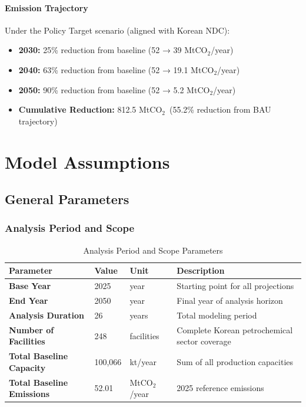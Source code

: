 \documentclass[11pt,a4paper]{report}
\newcommand{\mtco}{MtCO$_2$}
\begin{document}
\subsection*{Emission Trajectory}

Under the Policy Target scenario (aligned with Korean NDC):
\begin{itemize}[leftmargin=*]
    \item \textbf{2030:} 25\% reduction from baseline (52 → 39 \mtco/year)
    \item \textbf{2040:} 63\% reduction from baseline (52 → 19.1 \mtco/year)
    \item \textbf{2050:} 90\% reduction from baseline (52 → 5.2 \mtco/year)
    \item \textbf{Cumulative Reduction:} 812.5 \mtco\ (55.2\% reduction from BAU trajectory)
\end{itemize}

\clearpage

\part{Model Assumptions}
\label{part:assumptions}

\chapter{General Parameters}

\section{Analysis Period and Scope}

\begin{table}[H]
\centering
\caption{Analysis Period and Scope Parameters}
\begin{tabular}{p{5cm}p{3cm}p{2cm}p{5cm}}
\toprule
\textbf{Parameter} & \textbf{Value} & \textbf{Unit} & \textbf{Description} \\
\midrule
\textbf{Base Year} & 2025 & year & Starting point for all projections \\
\textbf{End Year} & 2050 & year & Final year of analysis horizon \\
\textbf{Analysis Duration} & 26 & years & Total modeling period \\
\textbf{Number of Facilities} & 248 & facilities & Complete Korean petrochemical sector coverage \\
\textbf{Total Baseline Capacity} & 100,066 & kt/year & Sum of all production capacities \\
\textbf{Total Baseline Emissions} & 52.01 & \mtco/year & 2025 reference emissions \\
\bottomrule
\end{tabular}
\label{tab:analysis-scope}
\end{table}
\end{document}

